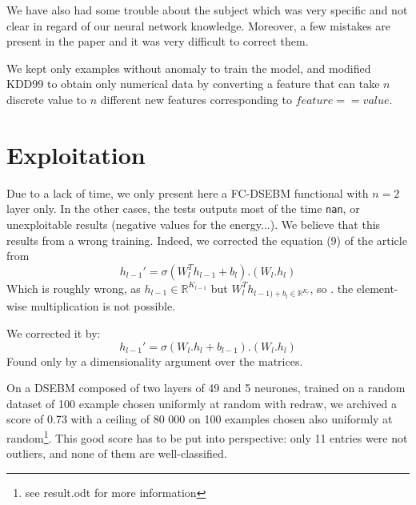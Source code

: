 \documentclass[a4paper]{article}
\begin{document}
We have also had some trouble about the subject which was very specific and not clear in regard of our neural network knowledge. Moreover, a few mistakes are present in the paper and it was very difficult to correct them.

We kept only examples without anomaly to train the model, and modified KDD99 to obtain only numerical data by converting a feature that can take $n$ discrete value to $n$ different new features corresponding to $feature == value$.


\section{Exploitation}
Due to a lack of time, we only present here a FC-DSEBM functional with $n=2$ layer only. In the other cases, the tests outputs most of the time \texttt{nan}, or unexploitable results (negative values for the energy...). We believe that this results from a wrong training. Indeed, we corrected the equation  (9) of the article from 
\[h_{l-1}' = \sigma (W_l^T h_{l-1} + b_l) . ( W_l.h_l)\]
Which is roughly wrong, as $h_{l-1} \in \mathbb{R}^{K_{l-1}}$ but $W_l^T h_{l-1) + b_l \in \mathbb{R}^{K_{l}}}$, so $.$ the element-wise multiplication is not possible.

We corrected it by:
\[h_{l-1}' = \sigma (W_{l}. h_{l} + b_{l-1}) . ( W_l.h_l)\]
Found only by a dimensionality argument over the matrices.

\bigskip

On a DSEBM composed of two layers of 49 and 5 neurones, trained on a random dataset of 100 example chosen uniformly at random with redraw, we archived a score of 0.73 with a ceiling of 80 000 on 100 examples chosen also uniformly at random\footnote{see result.odt for more information}. This good score has to be put into perspective: only 11 entries were not outliers, and none of them are well-classified.


\newpage



\end{document}
